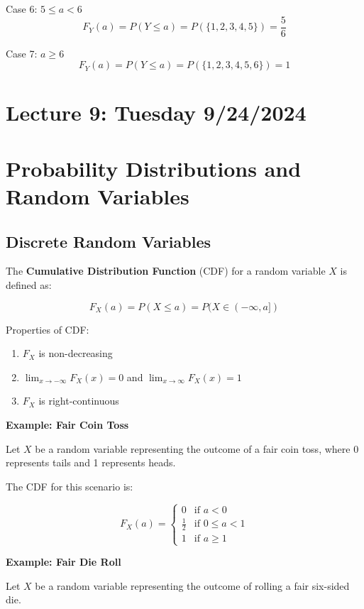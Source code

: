 \documentclass{article}
\begin{document}
    Case 6: \(5 \leq a < 6\)
    \[
        F_Y(a) = P(Y \leq a) = P(\{1, 2, 3, 4, 5\}) = \frac{5}{6}
    \]

    Case 7: \(a \geq 6\)
    \[
        F_Y(a) = P(Y \leq a) = P(\{1, 2, 3, 4, 5, 6\}) = 1
    \]


    \section*{Lecture 9: Tuesday 9/24/2024}

    \section*{Probability Distributions and Random Variables}

    \subsection*{Discrete Random Variables}

    The \textbf{Cumulative Distribution Function} (CDF) for a random variable \(X\) is defined as:

    \[F_X(a) = P(X \leq a) = P(X \in (-\infty, a])\]

    Properties of CDF:
    \begin{enumerate}
        \item \(F_X\) is non-decreasing
        \item \(\lim_{x \to -\infty} F_X(x) = 0\) and \(\lim_{x \to \infty} F_X(x) = 1\)
        \item $F_X$ is right-continuous
    \end{enumerate}

    \textbf{Example: Fair Coin Toss}

    Let $X$ be a random variable representing the outcome of a fair coin toss, where 0 represents tails and 1 represents heads.

    The CDF for this scenario is:

    \[
        F_X(a) = 
        \begin{cases} 
            0 & \text{if } a < 0 \\
            \frac{1}{2} & \text{if } 0 \leq a < 1 \\
            1 & \text{if } a \geq 1 
        \end{cases}
    \]

    \textbf{Example: Fair Die Roll}

    Let $X$ be a random variable representing the outcome of rolling a fair six-sided die.
\end{document}
